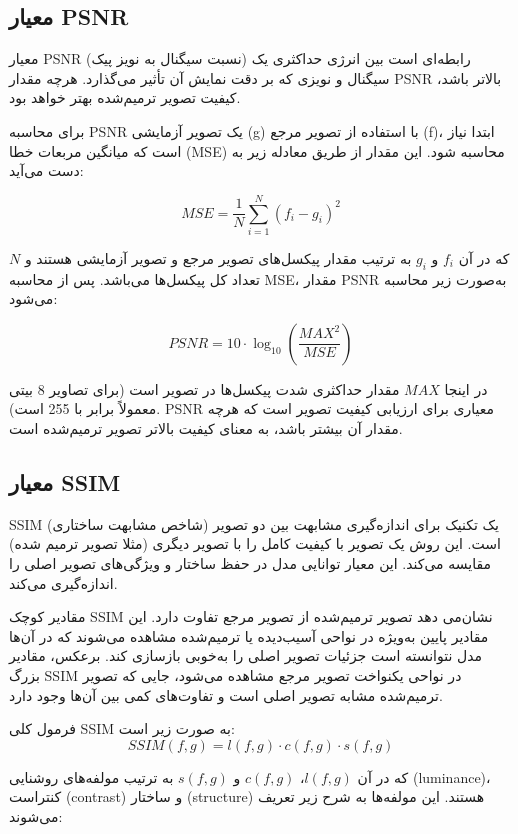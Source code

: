 \subsection{معیار PSNR}
معیار PSNR (نسبت سیگنال به نویز پیک) رابطه‌ای است بین انرژی حداکثری یک سیگنال و نویزی که بر دقت نمایش آن تأثیر می‌گذارد. هرچه مقدار PSNR بالاتر باشد، کیفیت تصویر ترمیم‌شده بهتر خواهد بود.

برای محاسبه PSNR یک تصویر آزمایشی (g) با استفاده از تصویر مرجع (f)، ابتدا نیاز است که میانگین مربعات خطا (MSE) محاسبه شود. این مقدار از طریق معادله زیر به دست می‌آید:

\[
MSE = \frac{1}{N} \sum_{i=1}^{N} (f_i - g_i)^2
\]

که در آن $f_i$ و $g_i$ به ترتیب مقدار پیکسل‌های تصویر مرجع و تصویر آزمایشی هستند و $N$ تعداد کل پیکسل‌ها می‌باشد. پس از محاسبه MSE، مقدار PSNR به‌صورت زیر محاسبه می‌شود:

\begin{equation}
	PSNR = 10 \cdot \log_{10}\left(\frac{MAX^2}{MSE}\right)
\end{equation}

در اینجا $MAX$ مقدار حداکثری شدت پیکسل‌ها در تصویر است (برای تصاویر 8 بیتی معمولاً برابر با 255 است). PSNR معیاری برای ارزیابی کیفیت تصویر است که هرچه مقدار آن بیشتر باشد، به معنای کیفیت بالاتر تصویر ترمیم‌شده است.

\subsection{معیار SSIM}

SSIM
(شاخص مشابهت ساختاری) یک تکنیک برای اندازه‌گیری مشابهت بین دو تصویر است. این روش یک تصویر با کیفیت کامل را با تصویر دیگری (مثلا تصویر ترمیم شده) مقایسه می‌کند. این معیار توانایی مدل در حفظ ساختار و ویژگی‌های تصویر اصلی را اندازه‌گیری می‌کند.

مقادیر کوچک SSIM نشان‌می دهد تصویر ترمیم‌شده از تصویر مرجع تفاوت دارد. این مقادیر پایین به‌ویژه در نواحی آسیب‌دیده یا ترمیم‌شده مشاهده می‌شوند که در آن‌ها مدل نتوانسته است جزئیات تصویر اصلی را به‌خوبی بازسازی کند. برعکس، مقادیر بزرگ SSIM در نواحی یکنواخت تصویر مرجع مشاهده می‌شود، جایی که تصویر ترمیم‌شده مشابه تصویر اصلی است و تفاوت‌های کمی بین آن‌ها وجود دارد.

فرمول کلی SSIM به صورت زیر است:
$$
SSIM(f, g) = l(f, g) \cdot c(f, g) \cdot s(f, g)
$$

که در آن $l(f, g)$، $c(f, g)$ و $s(f, g)$ به ترتیب مولفه‌های روشنایی (luminance)، کنتراست (contrast) و ساختار (structure) هستند. این مولفه‌ها به شرح زیر تعریف می‌شوند:

